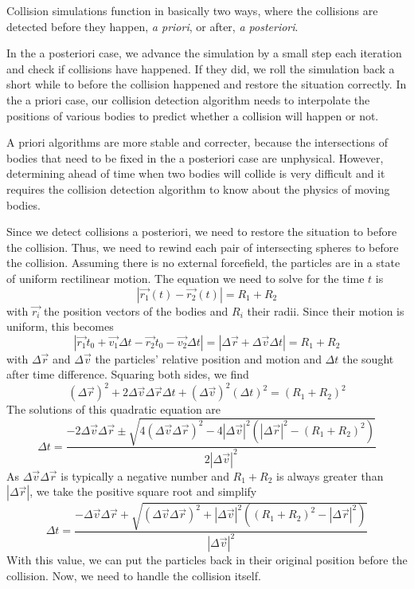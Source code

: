 Collision simulations function in basically two ways, where the collisions are 
detected before they happen, \emph{a priori}, or after, \emph{a posteriori}.  

In the a posteriori case, we advance the simulation by a small step each 
iteration and check if collisions have happened. If they did, we roll the 
simulation back a short while to before the collision happened and restore the 
situation correctly. In the a priori case, our collision detection algorithm 
needs to interpolate the positions of various bodies to predict whether a 
collision will happen or not.

A priori algorithms are more stable and correcter, because the intersections of 
bodies that need to be fixed in the a posteriori case are unphysical. However, 
determining ahead of time when two bodies will collide is very difficult and it 
requires the collision detection algorithm to know about the physics of moving 
bodies.

Since we detect collisions a posteriori, we need to restore the situation to 
before the collision. Thus, we need to rewind each pair of intersecting spheres 
to before the collision. Assuming there is no external forcefield, the 
particles are in a state of uniform rectilinear motion. The equation we need to 
solve for the time $t$ is
$$
|\vec{r_1}(t) - \vec{r_2}(t)| = R_1 + R_2
$$
with $\vec{r_i}$ the position vectors of the bodies and $R_i$ their radii.  
Since their motion is uniform, this becomes
$$
|\vec{r_1}{t_0} + \vec{v_1}\Delta t - \vec{r_2}{t_0} - \vec{v_2}\Delta t| = | 
\Delta\vec{r} + \Delta\vec{v} \Delta t | = R_1 + R_2
$$
with $\Delta\vec{r}$ and $\Delta\vec{v}$ the particles' relative position and 
motion and $\Delta t$ the sought after time difference. Squaring both sides, we 
find
$$
(\Delta\vec{r})^2 + 2\Delta\vec{v}\Delta\vec{r}\Delta t + 
(\Delta\vec{v})^2(\Delta t)^2 = (R_1 + R_2)^2
$$
The solutions of this quadratic equation are
$$
\Delta t = \frac{-2\Delta\vec{v}\Delta\vec{r}
\pm \sqrt{4( \Delta\vec{v}\Delta\vec{r})^2 -
4|\Delta\vec{v}|^2 \left( |\Delta\vec{r}|^2 - (R_1 + R_2)^2 \right) }}
{2|\Delta\vec{v}|^2}
$$
As $\Delta\vec{v}\Delta\vec{r}$ is typically a negative number and $R_1 + R_2$ 
is always greater than $|\Delta\vec{r}|$, we take the positive square root and 
simplify
$$
\Delta t=\frac{-\Delta\vec{v}\Delta\vec{r} + 
\sqrt{(\Delta\vec{v}\Delta\vec{r})^2 + |\Delta\vec{v}|^2
((R_1+R_2)^2 -|\Delta\vec{r}|^2)}}
{|\Delta\vec{v}|^2}
$$
With this value, we can put the particles back in their original position 
before the collision. Now, we need to handle the collision itself.

